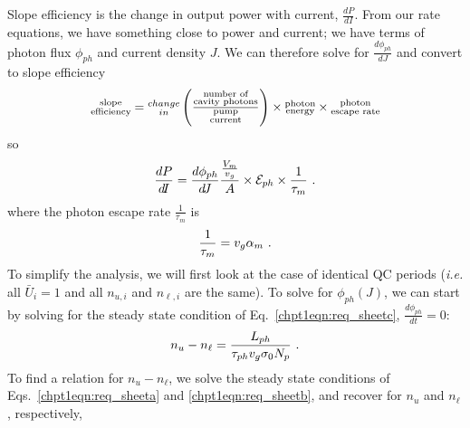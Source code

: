 {Slope efficiency is the change in output power with current, $\frac{d P}{dI}$.  From our rate equations, we have something close to power and current; we have terms of photon flux $\phi_{ph}$ and current density $J$.  We can therefore solve for $\frac{d \phi_{ph}}{dJ}$ and convert to slope efficiency
\begin{equation*}
\begin{subarray}{c}\textnormal{slope}\\\textnormal{efficiency}\end{subarray} = \begin{subarray}{c}change\\in\end{subarray} \left( \frac{\begin{subarray}{c}\textnormal{number of}\\\textnormal{cavity photons}\end{subarray}}{\begin{subarray}{c}\textnormal{pump}\\\textnormal{current}\end{subarray}} \right) \times \begin{subarray}{c}\textnormal{photon}\\ \textnormal{energy}\end{subarray} \times \begin{subarray}{c}\textnormal{photon}\\ \textnormal{escape rate}\end{subarray}
\end{equation*}
so
\begin{equation}
\label{chpt1eqn:slope_eff_outline}
\frac{d P}{d\!I} = \frac{d \phi_{ph}}{d\!J} \frac{\frac{V_m}{v_g}}{A} \times \EE_{ph} \times \frac{1}{\tau_m} \text{~.}
\end{equation}
where the photon escape rate $\frac{1}{\tau_m}$ is
\begin{equation}
\frac{1}{\tau_m} = v_g \alpha_m \textnormal{~.}
\end{equation}
To simplify the analysis, we will first look at the case of identical QC periods (\emph{i.e.} all $\bar{U}_i=1$ and all $n_{u,i}$ and $n_{\ell,i}$ are the same).  To solve for $\phi_{ph}(J)$, we can start by solving for the steady state condition of Eq.~\eqref{chpt1eqn:req_sheetc}, $\frac{d \phi_{ph}}{d\!t}=0$:
\begin{equation}
\label{chpt1eqn:n_uminusn_l_easy}
n_u-n_\ell=\frac{L_{ph}}{\tau_{ph} v_g \sigma_0 N_p} \textnormal{~.}
\end{equation}
To find a relation for $n_u-n_\ell$, we solve the steady state conditions of Eqs.~\eqref{chpt1eqn:req_sheeta} and \eqref{chpt1eqn:req_sheetb}, and recover for $n_u$ and $n_\ell$, respectively,
}
